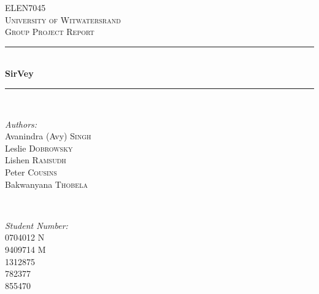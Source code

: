 \documentclass[12pt]{witseiepaper}
\begin{document}
\begin{titlepage}
  
  \newcommand{\HRule}{\rule{\linewidth}{0.5mm}} 
  
  \begin{center}
    
    \textsc{\LARGE ELEN7045}\\[1.5cm]
    
    \textsc{\Large University of Witwatersrand}\\[0.5cm]
    
    \textsc{\large  Group Project Report}\\[0.5cm]
    
    \HRule \\[0.4cm]
    { \huge \bfseries SirVey}\\[0.5cm]
    
    \HRule \\[1.5cm]
    \begin{minipage}
      {0.4
      \textwidth} 
      \begin{flushleft}
        \large \emph{Authors:}\\
        Avanindra (Avy) \textsc{Singh} \\
        Leslie \textsc{Dobrowsky} \\
        Lishen \textsc{Ramsudh} \\
        Peter \textsc{Cousins} \\
        Bakwanyana \textsc{Thobela} \\

        
      \end{flushleft}
    \end{minipage}
    ~ 
    \begin{minipage}
      {0.4
      \textwidth} 
      \begin{flushright}
        \large \emph{Student Number:} \\
        0704012 \textsc{N} \\
        9409714 \textsc{M}  \\
        1312875 \\
        782377  \\
        855470
      \end{flushright}
    \end{minipage}
    \\[2cm]
    

\end{center}
\end{titlepage}
\end{document}
